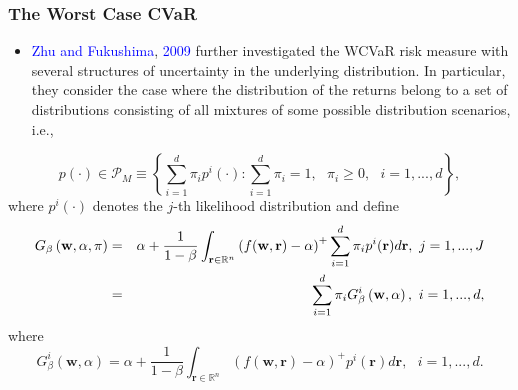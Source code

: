 \documentclass[pdf,10pt,xcolor=dvipsnames,hide notes]{beamer}
\begin{document}
\begin{frame}[label=frame2e]
	\frametitle{The Worst Case CVaR}
	
	\begin{itemize}
		\justifying
		
		\item \textcolor{blue}{Zhu and Fukushima}, \textcolor{blue}{2009} further investigated the WCVaR risk measure with
		several structures of uncertainty in the underlying distribution. In
		particular, they consider the case where the distribution
		of the returns belong to a set of distributions consisting of all mixtures of some
		possible distribution scenarios, i.e.,
		
	\end{itemize}
	
\begin{equation}
p\left( \cdot \right) \in \mathcal{P}_{M}\equiv \left\{ \sum_{i=1}^{d}\pi
_{i}p^{i}\left( \cdot \right) :\sum_{i=1}^{d}\pi _{i}=1,\text{ }\pi _{i}\geq
0,\text{ }i=1,...,d\right\} ,  \label{15}
\end{equation}%
where $p^{i}\left( \cdot \right) $ denotes the $j$-th likelihood
distribution and define
\begin{eqnarray}
G_{\beta }\left( \mathbf{w},\alpha ,\pi \right) &=&\alpha +\frac{1}{1-\beta }%
\int_{\mathbf{r}\in
	\mathbb{R}
	^{n}}\left( f(\mathbf{w},\mathbf{r})-\alpha \right) ^{+}\sum_{i=1}^{d}\pi
_{i}p^{i}(\mathbf{r})d\mathbf{r},\text{ }j=1,...,J  \notag \\
&=&\sum_{i=1}^{d}\pi _{i}G_{\beta }^{i}\left( \mathbf{w},\alpha \right) ,%
\text{ }i=1,...,d,  \label{16}
\end{eqnarray}%
where%
\begin{equation}
G_{\beta }^{i}\left( \mathbf{w},\alpha \right) =\alpha +\frac{1}{1-\beta }%
\int_{\mathbf{r}\in
	\mathbb{R}
	^{n}}\left( f(\mathbf{w},\mathbf{r})-\alpha \right) ^{+}p^{i}(\mathbf{r})d%
\mathbf{r},\text{ }i=1,...,d.  \label{17}
\end{equation}%
	
\end{frame}
\end{document}
